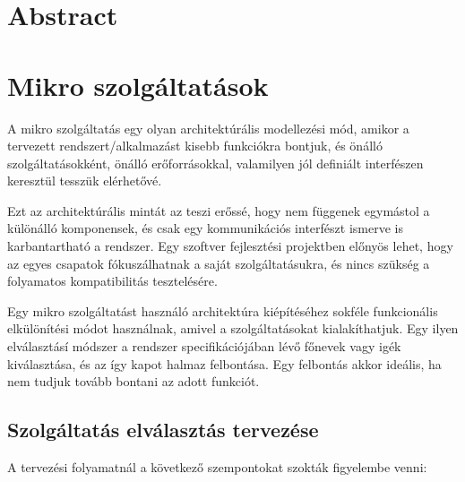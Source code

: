 \documentclass[11pt,magyar,a4paper,oneside,]{report}
\begin{document}
\chapter*{Abstract}\label{abstract}

\chapter{\texorpdfstring{Mikro szolgáltatások\citep{microservices}
\citep{micro-arch}
\citep{microservices-light}}{Mikro szolgáltatások{[}@microservices{]} {[}@micro-arch{]} {[}@microservices-light{]}}}\label{mikro-szolguxe1ltatuxe1sokmicroservices-micro-arch-microservices-light}

A mikro szolgáltatás egy olyan architektúrális modellezési mód, amikor a
tervezett rendszert/alkalmazást kisebb funkciókra bontjuk, és önálló
szolgáltatásokként, önálló erőforrásokkal, valamilyen jól definiált
interfészen keresztül tesszük elérhetővé.

Ezt az architektúrális mintát az teszi erőssé, hogy nem függenek
egymástol a különálló komponensek, és csak egy kommunikációs interfészt
ismerve is karbantartható a rendszer. Egy szoftver fejlesztési
projektben előnyös lehet, hogy az egyes csapatok fókuszálhatnak a saját
szolgáltatásukra, és nincs szükség a folyamatos kompatibilitás
tesztelésére.

Egy mikro szolgáltatást használó architektúra kiépítéséhez sokféle
funkcionális elkülönítési módot használnak, amivel a szolgáltatásokat
kialakíthatjuk. Egy ilyen elválasztásí módszer a rendszer
specifikációjában lévő főnevek vagy igék kiválasztása, és az így kapot
halmaz felbontása. Egy felbontás akkor ideális, ha nem tudjuk tovább
bontani az adott funkciót.

\section{Szolgáltatás elválasztás
tervezése}\label{szolguxe1ltatuxe1s-elvuxe1lasztuxe1s-tervezuxe9se}

A tervezési folyamatnál a következő szempontokat szokták figyelembe
venni:
\end{document}
